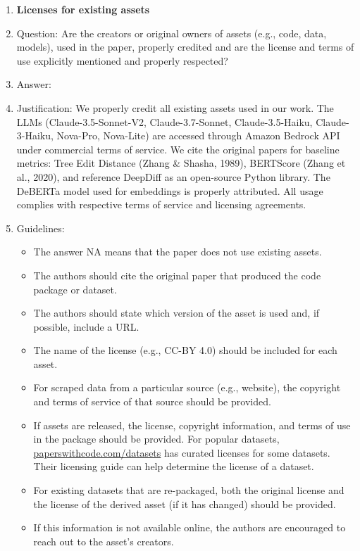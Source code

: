 \documentclass{article}
\begin{document}
\begin{enumerate}
\item {\bf Licenses for existing assets}
    \item[] Question: Are the creators or original owners of assets (e.g., code, data, models), used in the paper, properly credited and are the license and terms of use explicitly mentioned and properly respected?
    \item[] Answer: \answerYes{} %
    \item[] Justification: \justification We properly credit all existing assets used in our work. The LLMs (Claude-3.5-Sonnet-V2, Claude-3.7-Sonnet, Claude-3.5-Haiku, Claude-3-Haiku, Nova-Pro, Nova-Lite) are accessed through Amazon Bedrock API under commercial terms of service. We cite the original papers for baseline metrics: Tree Edit Distance (Zhang & Shasha, 1989), BERTScore (Zhang et al., 2020), and reference DeepDiff as an open-source Python library. The DeBERTa model used for embeddings is properly attributed. All usage complies with respective terms of service and licensing agreements.{}
    \item[] Guidelines:
    \begin{itemize}
        \item The answer NA means that the paper does not use existing assets.
        \item The authors should cite the original paper that produced the code package or dataset.
        \item The authors should state which version of the asset is used and, if possible, include a URL.
        \item The name of the license (e.g., CC-BY 4.0) should be included for each asset.
        \item For scraped data from a particular source (e.g., website), the copyright and terms of service of that source should be provided.
        \item If assets are released, the license, copyright information, and terms of use in the package should be provided. For popular datasets, \url{paperswithcode.com/datasets} has curated licenses for some datasets. Their licensing guide can help determine the license of a dataset.
        \item For existing datasets that are re-packaged, both the original license and the license of the derived asset (if it has changed) should be provided.
        \item If this information is not available online, the authors are encouraged to reach out to the asset's creators.
    \end{itemize}


\end{enumerate}
\end{document}
